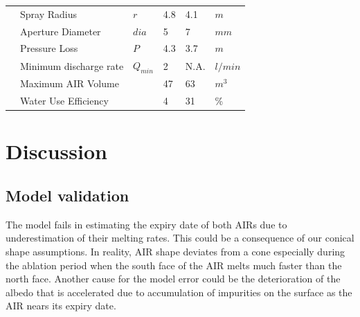 \documentclass[tc, manuscript]{copernicus}
\begin{document}
\begin{table}
\begin{tabular}{@{}|llllll|@{}}
                           & Spray Radius                    &  $r$            & 4.8           & 4.1           & $m$ \\
		\multicolumn{1}{|l|}{} & Aperture Diameter               &  $dia$          & 5             & 7             & $mm$ \\
		\multicolumn{1}{|l|}{} & Pressure Loss                   &  $P$            & 4.3           & 3.7           & $m$ \\
		\multicolumn{1}{|l|}{} & Minimum discharge rate          &  $Q_{min}$      & 2           & N.A.          & $l/min$ \\\midrule
		\multicolumn{1}{|l|}{\multirow{2}{*}{\rotatebox[origin=c]{90}{AIR}}}

		                       & Maximum AIR Volume              &                 & 47            & 63            & $m^{3}$ \\
		\multicolumn{1}{|l|}{} & Water Use Efficiency            &                 & 4             & 31            & \% \\\midrule
	\end{tabular}
\end{table}


\section{Discussion}

\subsection{Model validation}

The model fails in estimating the expiry date of both AIRs due to underestimation of their melting rates. This
could be a consequence of our conical shape assumptions. In reality, AIR shape deviates from a cone especially
during the ablation period when the south face of the AIR melts much faster than the north face. Another cause
for the model error could be the deterioration of the albedo that is accelerated due to accumulation of
impurities on the surface as the AIR nears its expiry date.
\end{document}
